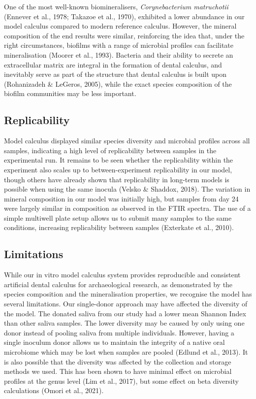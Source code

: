 \documentclass[
]{article}
\begin{document}
One of the most well-known biomineralisers, \emph{Corynebacterium
matruchotii} (Ennever et al., 1978; Takazoe et al., 1970), exhibited a
lower abundance in our model calculus compared to modern reference
calculus. However, the mineral composition of the end results were
similar, reinforcing the idea that, under the right circumstances,
biofilms with a range of microbial profiles can facilitate
mineralisation (Moorer et al., 1993). Bacteria and their ability to
secrete an extracellular matrix are integral in the formation of dental
calculus, and inevitably serve as part of the structure that dental
calculus is built upon (Rohanizadeh \& LeGeros, 2005), while the exact
species composition of the biofilm communities may be less important.

\hypertarget{replicability}{%
\subsection{Replicability}\label{replicability}}

Model calculus displayed similar species diversity and microbial
profiles across all samples, indicating a high level of replicability
between samples in the experimental run. It remains to be seen whether
the replicability within the experiment also scales up to
between-experiment replicability in our model, though others have
already shown that replicability in long-term models is possible when
using the same inocula (Velsko \& Shaddox, 2018). The variation in
mineral composition in our model was initially high, but samples from
day 24 were largely similar in composition as observed in the FTIR
spectra. The use of a simple multiwell plate setup allows us to submit
many samples to the same conditions, increasing replicability between
samples (Exterkate et al., 2010).

\hypertarget{limitations}{%
\subsection{Limitations}\label{limitations}}

While our in vitro model calculus system provides reproducible and
consistent artificial dental calculus for archaeological research, as
demonstrated by the species composition and the mineralisation
properties, we recognise the model has several limitations. Our
single-donor approach may have affected the diversity of the model. The
donated saliva from our study had a lower mean Shannon Index than other
saliva samples. The lower diversity may be caused by only using one
donor instead of pooling saliva from multiple individuals. However,
having a single inoculum donor allows us to maintain the integrity of a
native oral microbiome which may be lost when samples are pooled (Edlund
et al., 2013). It is also possible that the diversity was affected by
the collection and storage methods we used. This has been shown to have
minimal effect on microbial profiles at the genus level (Lim et al.,
2017), but some effect on beta diversity calculations (Omori et al.,
2021).
\end{document}
